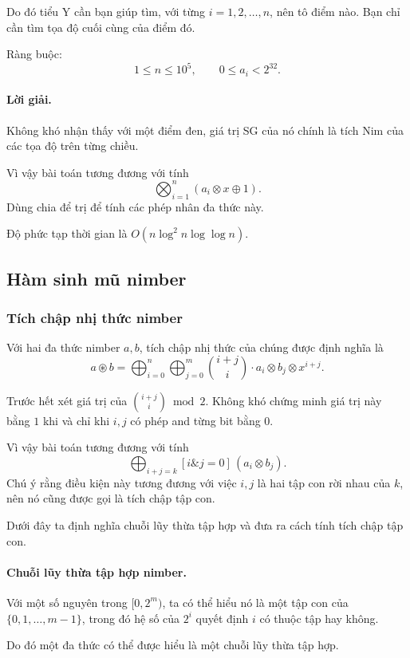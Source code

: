 \documentclass[11pt]{article}
\begin{document}
Do đó tiểu Y cần bạn giúp tìm, với từng \(i=1,2,\ldots,n\), nên tô điểm nào.
Bạn chỉ cần tìm tọa độ cuối cùng của điểm đó.

Ràng buộc:
\[
  1\le n\le 10^5,\qquad 0\le a_i<2^{32}.
\]

\paragraph{Lời giải.}
Không khó nhận thấy với một điểm đen, giá trị SG của nó chính là tích Nim của
các tọa độ trên từng chiều.

Vì vậy bài toán tương đương với tính
\[
  \bigotimes_{i=1}^n (a_i\otimes x\oplus 1).
\]
Dùng chia để trị để tính các phép nhân đa thức này.

Độ phức tạp thời gian là \(O(n\log^2 n\log\log n)\).

\subsection{Hàm sinh mũ nimber}

\subsubsection{Tích chập nhị thức nimber}

Với hai đa thức nimber \(a,b\), tích chập nhị thức của chúng được định nghĩa là
\[
  a\circledast b=
  \bigoplus_{i=0}^n\bigoplus_{j=0}^m
  \binom{i+j}{i}\cdot a_i\otimes b_j\otimes x^{i+j}.
\]

Trước hết xét giá trị của \(\binom{i+j}{i}\bmod 2\). Không khó chứng minh giá
trị này bằng \(1\) khi và chỉ khi \(i,j\) có phép and từng bit bằng \(0\).

Vì vậy bài toán tương đương với tính
\[
  \bigoplus_{i+j=k} [i\mathbin{\&}j=0]\,(a_i\otimes b_j).
\]
Chú ý rằng điều kiện này tương đương với việc \(i,j\) là hai tập con rời nhau
của \(k\), nên nó cũng được gọi là tích chập tập con.

Dưới đây ta định nghĩa chuỗi lũy thừa tập hợp và đưa ra cách tính tích chập tập
con.

\paragraph{Chuỗi lũy thừa tập hợp nimber.}
Với một số nguyên trong \([0,2^m)\), ta có thể hiểu nó là một tập con của
\(\{0,1,\ldots,m-1\}\), trong đó hệ số của \(2^i\) quyết định \(i\) có thuộc tập
hay không.

Do đó một đa thức có thể được hiểu là một chuỗi lũy thừa tập hợp.
\end{document}
